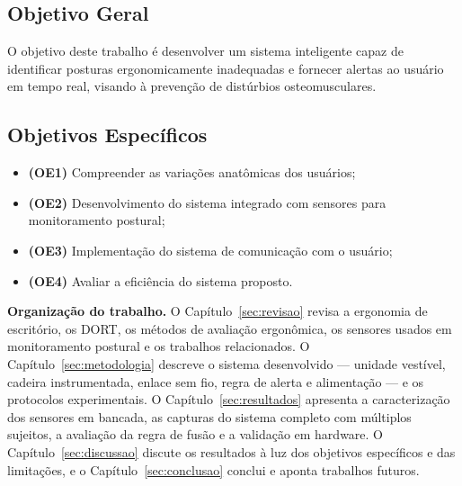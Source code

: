 \subsection{Objetivo Geral}

O objetivo deste trabalho é desenvolver um sistema inteligente capaz de identificar
posturas ergonomicamente inadequadas e fornecer alertas ao usuário em tempo real,
visando à prevenção de distúrbios osteomusculares.

\subsection{Objetivos Específicos}
\begin{itemize}[nosep]
  \item \textbf{(OE1)} Compreender as variações anatômicas dos usuários;
  \item \textbf{(OE2)} Desenvolvimento do sistema integrado com sensores para
        monitoramento postural;
  \item \textbf{(OE3)} Implementação do sistema de comunicação com o usuário;
  \item \textbf{(OE4)} Avaliar a eficiência do sistema proposto.
\end{itemize}

\noindent\textbf{Organização do trabalho.} O Capítulo~\ref{sec:revisao} revisa
a ergonomia de escritório, os DORT, os métodos de avaliação ergonômica, os
sensores usados em monitoramento postural e os trabalhos relacionados. O
Capítulo~\ref{sec:metodologia} descreve o sistema desenvolvido --- unidade
vestível, cadeira instrumentada, enlace sem fio, regra de alerta e alimentação
--- e os protocolos experimentais. O Capítulo~\ref{sec:resultados} apresenta a
caracterização dos sensores em bancada, as capturas do sistema completo com
múltiplos sujeitos, a avaliação da regra de fusão e a validação em hardware. O
Capítulo~\ref{sec:discussao} discute os resultados à luz dos objetivos
específicos e das limitações, e o Capítulo~\ref{sec:conclusao} conclui e aponta
trabalhos futuros.
